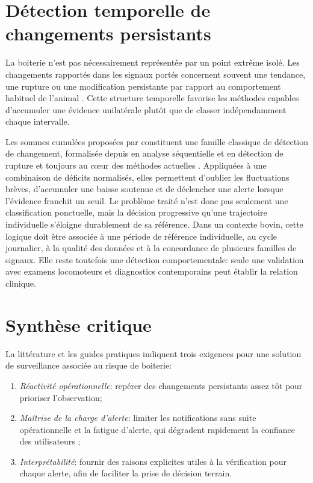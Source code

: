 \section{Détection temporelle de changements persistants}

La boiterie n'est pas nécessairement représentée par un point extrême isolé. Les changements
rapportés dans les signaux portés concernent souvent une tendance, une rupture ou une
modification persistante par rapport au comportement habituel de l'animal
\citep{alsaaod2019automatic,paudyal2021lying}. Cette structure temporelle favorise les
méthodes capables d'accumuler une évidence unilatérale plutôt que de classer indépendamment
chaque intervalle.

Les sommes cumulées proposées par \citet{page1954continuous} constituent une famille
classique de détection de changement, formalisée depuis en analyse séquentielle et en
détection de rupture \citep{basseville1993detection} et toujours au cœur des méthodes
actuelles \citep{truong2020selective}. Appliquées à une combinaison de déficits normalisés,
elles permettent d'oublier les fluctuations brèves, d'accumuler une baisse soutenue et de
déclencher une alerte lorsque l'évidence franchit un seuil. Le problème traité n'est donc pas
seulement une classification ponctuelle, mais la décision progressive qu'une trajectoire
individuelle s'éloigne durablement de sa référence. Dans un contexte bovin, cette logique doit
être associée à une période de référence individuelle, au cycle journalier, à la qualité des
données et à la concordance de plusieurs familles de signaux. Elle reste toutefois une détection
comportementale: seule une validation avec examens locomoteurs et diagnostics contemporains
peut établir la relation clinique.

\section{Synthèse critique}

La littérature et les guides pratiques indiquent trois exigences pour une solution de
surveillance associée au risque de boiterie:
\begin{enumerate}
  \item \textit{Réactivité opérationnelle}: repérer des changements persistants assez tôt
  pour prioriser l'observation;
  \item \textit{Maîtrise de la charge d'alerte}: limiter les notifications sans suite opérationnelle
  et la fatigue d'alerte, qui dégradent rapidement la confiance des utilisateurs
  \citep{rutten2013invited};
  \item \textit{Interprétabilité}: fournir des raisons explicites utiles à la vérification pour
  chaque alerte, afin de faciliter la prise de décision terrain.
\end{enumerate}

